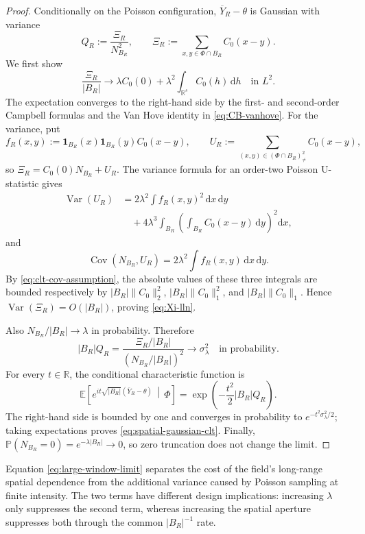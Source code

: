 \documentclass[11pt,a4paper]{article}
\theoremstyle{remark}
\newcommand{\R}{\mathbb R}
\newcommand{\EE}{\mathbb E}
\newcommand{\PP}{\mathbb P}
\DeclareMathOperator{\Cov}{Cov}
\DeclareMathOperator{\Var}{Var}
\begin{document}
\begin{proof}
Conditionally on the Poisson configuration, \(\overline Y_R-\theta\) is Gaussian with variance
\[
 Q_R:=\frac{\Xi_R}{N_{B_R}^2},
 \qquad
 \Xi_R:=\sum_{x,y\in\Phi\cap B_R}C_0(x-y).
\]
We first show
\begin{equation}
\label{eq:Xi-lln}
 \frac{\Xi_R}{|B_R|}
 \longrightarrow
 \lambda C_0(0)+\lambda^2\int_{\R^s}C_0(h)\,\mathrm dh
 \quad\text{in }L^2.
\end{equation}
The expectation converges to the right-hand side by the first- and second-order Campbell formulas and the Van Hove identity in \eqref{eq:CB-vanhove}.  For the variance, put
\[
 f_R(x,y):=\mathbf1_{B_R}(x)\mathbf1_{B_R}(y)C_0(x-y),
 \qquad
 U_R:=\sum_{(x,y)\in(\Phi\cap B_R)^2_{\ne}}C_0(x-y),
\]
so \(\Xi_R=C_0(0)N_{B_R}+U_R\).  The variance formula for an order-two Poisson U-statistic gives \cite{lastpenrose2017}
\begin{align*}
 \Var(U_R)
 &=2\lambda^2\int f_R(x,y)^2\,\mathrm dx\,\mathrm dy\\
 &\quad+4\lambda^3\int_{B_R}\left(\int_{B_R}C_0(x-y)\,\mathrm dy\right)^2\mathrm dx,
\end{align*}
and
\[
 \Cov(N_{B_R},U_R)=2\lambda^2\int f_R(x,y)\,\mathrm dx\,\mathrm dy.
\]
By \eqref{eq:clt-cov-assumption}, the absolute values of these three integrals are bounded respectively by
\(|B_R|\|C_0\|_2^2\), \(|B_R|\|C_0\|_1^2\), and \(|B_R|\|C_0\|_1\).  Hence \(\Var(\Xi_R)=O(|B_R|)\), proving \eqref{eq:Xi-lln}.

Also \(N_{B_R}/|B_R|\to\lambda\) in probability.  Therefore
\[
 |B_R|Q_R
 =\frac{\Xi_R/|B_R|}{(N_{B_R}/|B_R|)^2}
 \longrightarrow \sigma_\lambda^2
 \quad\text{in probability}.
\]
For every \(t\in\R\), the conditional characteristic function is
\[
 \EE\!\left[e^{it\sqrt{|B_R|}(\overline Y_R-\theta)}\,\middle|\,\Phi\right]
 =\exp\!\left(-\frac{t^2}{2}|B_R|Q_R\right).
\]
The right-hand side is bounded by one and converges in probability to
\(e^{-t^2\sigma_\lambda^2/2}\); taking expectations proves \eqref{eq:spatial-gaussian-clt}.  Finally, \(\PP(N_{B_R}=0)=e^{-\lambda|B_R|}\to0\), so zero truncation does not change the limit.
\end{proof}

Equation \eqref{eq:large-window-limit} separates the cost of the field's long-range spatial dependence from the additional variance caused by Poisson sampling at finite intensity.  The two terms have different design implications: increasing \(\lambda\) only suppresses the second term, whereas increasing the spatial aperture suppresses both through the common \(|B_R|^{-1}\) rate.
\end{document}
